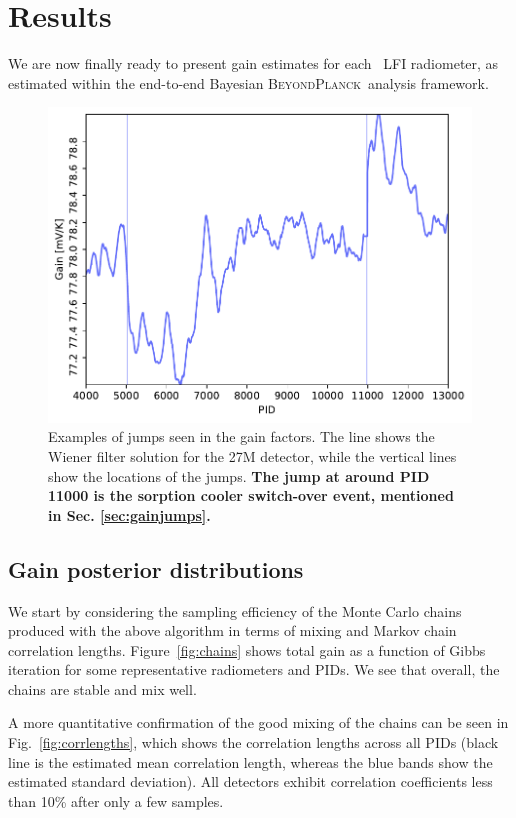 \documentclass[twocolumn]{aa}
\newcommand{\BP}{\textsc{BeyondPlanck}}
\begin{document}
\section{Results}
\label{sec:results}

We are now finally ready to present gain estimates for each
\Planck\ LFI radiometer, as estimated within the end-to-end Bayesian
\BP\ analysis framework. 
\begin{figure}[t]
  \center
    \includegraphics[width=\linewidth]{figs/gain_jumps.pdf}
    \caption{Examples of jumps seen in the gain factors. The line shows the Wiener filter solution for the 27M detector, while the vertical lines show the locations of the jumps. \textbf{The jump at around PID 11000 is the sorption cooler switch-over event, mentioned in Sec. \ref{sec:gainjumps}.}}
  \label{fig:gain_jumps}
\end{figure}


\subsection{Gain posterior distributions}

We start by considering the sampling efficiency of the Monte Carlo
chains produced with the above algorithm in terms of mixing and Markov
chain correlation lengths. Figure~\ref{fig:chains} shows total gain as
a function of Gibbs iteration for some representative radiometers and
PIDs. We see that overall, the chains are stable and mix well.

A more quantitative confirmation of the good mixing of the chains can be seen in
Fig.~\ref{fig:corrlengths}, which shows the correlation lengths across all
PIDs (black line is the estimated mean correlation length, whereas the blue
bands show the estimated standard deviation). All detectors exhibit
correlation coefficients less than 10\% after only a few samples.
\end{document}
